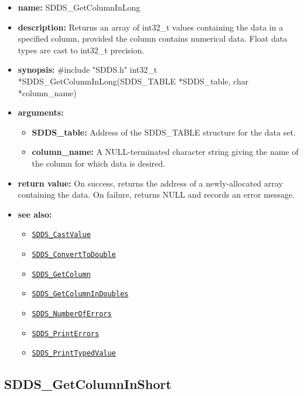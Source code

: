 \documentclass[11pt]{article}
\newcommand{\progref}[1]{\hyperref[SDDS_#1]{\tt SDDS\_#1}}
\begin{document}
\begin{itemize}
\item {\bf name:}\newline
SDDS\_GetColumnInLong
\item {\bf description:}\newline
Returns an array of int32\_t values containing the data in a specified column, provided the column contains numerical data. Float data types are cast to int32\_t precision.
\item {\bf synopsis:} \#include "SDDS.h"\newline
int32\_t *SDDS\_GetColumnInLong(SDDS\_TABLE *SDDS\_table, char *column\_name)
\item {\bf arguments:}
\begin{itemize}
\item {\bf SDDS\_table:} Address of the SDDS\_TABLE structure for the data set.
\item {\bf column\_name:} A NULL-terminated character string giving the name of the column for which data is desired.
\end{itemize}
\item {\bf return value:}\newline
On success, returns the address of a newly-allocated array containing the data. On failure, returns NULL and records an error message.
\item {\bf see also:}
\begin{itemize}
\item \progref{CastValue}
\item \progref{ConvertToDouble}
\item \progref{GetColumn}
\item \progref{GetColumnInDoubles}
\item \progref{NumberOfErrors}
\item \progref{PrintErrors}
\item \progref{PrintTypedValue}
\end{itemize}
\end{itemize}

\subsection{SDDS\_GetColumnInShort}
\label{SDDS_GetColumnInShort}
\end{document}
